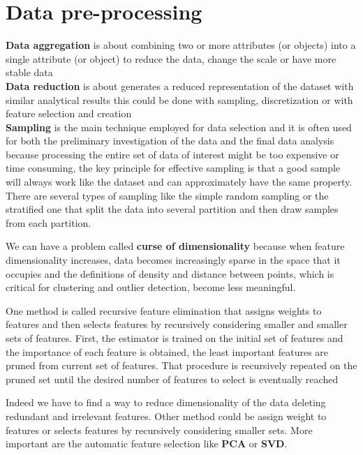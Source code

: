 \section{Data pre-processing}
\textbf{Data aggregation} is about combining two or more attributes (or objects) into a single attribute (or object) to reduce the data, change the scale or have more stable data\\
\textbf{Data reduction} is about generates a reduced representation of the dataset with similar analytical results this could be done with sampling, discretization or with feature selection and creation\\
\textbf{Sampling} is the main technique employed for data selection and it is often used for both the preliminary investigation of the data and the final data analysis because processing the entire set of data of interest might be too expensive or time consuming, the key principle for effective sampling is that a good sample will always work like the dataset and can approximately have the same property. There are several types of sampling like the simple random sampling or the stratified one that split the data into several partition and then draw samples from each partition.

We can have a problem called \textbf{curse of dimensionality} because when feature dimensionality increases, data becomes increasingly sparse in the space that it occupies and the definitions of density and distance between points, which is critical for clustering and outlier detection, become less meaningful.

One method is called recursive feature elimination that assigns weights to features and then selects features by recursively considering smaller and smaller sets of features.  First, the estimator is trained on the initial set of features and the importance of each feature is obtained, the least important features are pruned from current set of features. That procedure is recursively repeated on the pruned set until the
desired number of features to select is eventually reached

Indeed we have to find a way to reduce dimensionality of the data deleting redundant and irrelevant features. Other method could be assign weight to features or selects features by recursively considering smaller sets. More important are the automatic feature selection like \textbf{PCA} or \textbf{SVD}.
